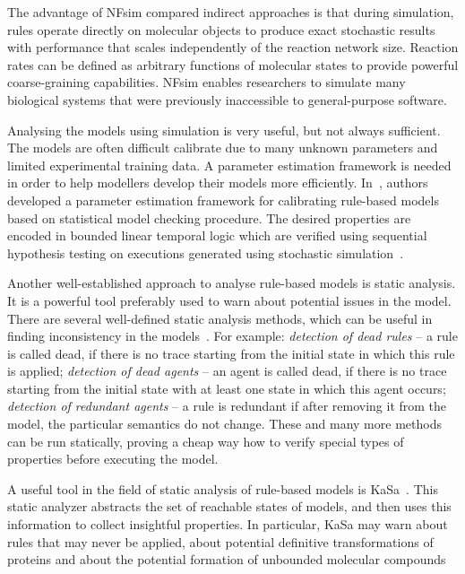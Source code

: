 \documentclass[11pt,a4paper]{report}
\begin{document}
The advantage of NFsim compared indirect approaches is that during simulation, rules operate directly on molecular objects to produce exact stochastic results with performance that scales independently of the reaction network size. Reaction rates can be defined as arbitrary functions of molecular states to provide powerful coarse-graining capabilities. NFsim enables researchers to simulate many biological systems that were previously inaccessible to general-purpose software.

Analysing the models using simulation is very useful, but not always sufficient. The models are often difficult calibrate due to many unknown parameters and limited experimental training data. A parameter estimation framework is needed in order to help modellers develop their models more efficiently. In~\cite{liu2016parameter}, authors developed a parameter estimation framework for calibrating rule-based models based on statistical model checking procedure. The desired properties are encoded in bounded linear temporal logic which are verified using sequential hypothesis testing on executions generated using stochastic simulation~\cite{clarke2008statistical}.

Another well-established approach to analyse rule-based models is static analysis. It is a powerful tool preferably used to warn about potential issues in the model. There are several well-defined static analysis methods, which can be useful in finding inconsistency in the models~\cite{danos2009rule}. For example: \emph{detection of dead rules} -- a rule is called dead, if there is no trace starting from the initial state in which this rule is applied; \emph{detection of dead agents} -- an agent is called dead, if there is no trace starting from the initial state with at least one state in which this agent occurs; \emph{detection of redundant agents} -- a rule is redundant if after removing it from the model, the particular semantics do not change. These and many more methods can be run statically, proving a cheap way how to verify special types of properties before executing the model.

A useful tool in the field of static analysis of rule-based models is KaSa~\cite{boutillier2018kasa}. This static analyzer abstracts the set of reachable states of models, and then uses this information to collect insightful properties. In particular, KaSa may warn about rules that may never be applied, about potential definitive transformations of proteins and about the potential formation of unbounded molecular compounds
\end{document}
